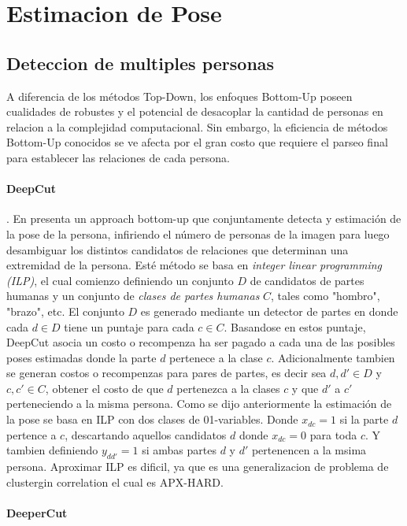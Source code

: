 \documentclass[runningheads]{llncs}
\begin{document}
\section{Estimacion de Pose}

\subsection{Deteccion de multiples personas}
A diferencia de los métodos Top-Down, los enfoques Bottom-Up poseen cualidades de robustes y el potencial de desacoplar la cantidad de personas en relacion a la complejidad computacional. Sin embargo, la eficiencia de métodos Bottom-Up conocidos se ve afecta por el gran costo que requiere el parseo final para establecer las relaciones de cada persona.

\paragraph{DeepCut}. En \cite{bottom1} presenta un approach bottom-up que conjuntamente detecta y estimación de la pose de la persona, infiriendo el número de personas de la imagen para luego desambiguar los distintos candidatos de relaciones que determinan una extremidad de la persona. Esté método se basa en \textit{integer linear programming (ILP)}, el cual comienzo definiendo un conjunto $D$ de candidatos de partes humanas y un conjunto de \textit{clases de partes humanas} $C$, tales como "hombro", "brazo", etc. El conjunto $D$ es generado mediante un detector de partes en donde cada $ d \in D$ tiene un puntaje para cada $ c \in C$. Basandose en estos puntaje, DeepCut asocia un costo o recompenza ha ser pagado a cada una de las posibles poses estimadas donde la parte $d$ pertenece a la clase $c$. Adicionalmente tambien se generan costos o recompenzas para pares de partes, es decir sea $d,d' \in D$ y $c,c' \in C$, obtener el costo de que $d$ pertenezca a la clases $c$ y que $d'$ a $c'$ perteneciendo a la misma persona.
Como se dijo anteriormente la estimación de la pose se basa en ILP con dos clases de 01-variables. Donde $x_{dc} = 1$ si la parte $d$ pertence a $c$, descartando aquellos candidatos $d$ donde $x_{dc} = 0$ para toda $c$. Y tambien definiendo $y_{dd'} = 1 $ si ambas partes $d$ y $d'$ pertenencen a la msima persona. Aproximar ILP es dificil, ya que es una generalizacion de problema de clustergin correlation el cual es APX-HARD.

\paragraph{DeeperCut}
\end{document}
